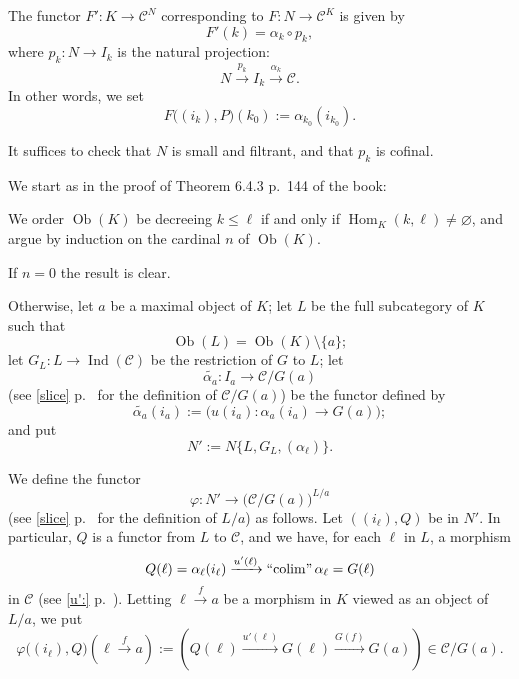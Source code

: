 \documentclass[12pt]{article}
\theoremstyle{remark}
\theoremstyle{definition}
\newcommand{\C}{\mathcal C}
\newcommand{\pp}{\varphi}
\newcommand{\xr}{\xrightarrow}
\DeclareMathOperator*{\colim}{colim}
\DeclareMathOperator*{\icolim}{``\!\colim\!"}
\DeclareMathOperator{\Hom}{Hom}
\DeclareMathOperator{\Ind}{Ind}
\DeclareMathOperator{\Ob}{Ob}
\begin{document}
The functor $F':K\to\C^N$ corresponding to $F:N\to\C^K$ is given by 
$$
F'(k)=\alpha_k\circ p_k,
$$ 
where $p_k:N\to I_k$ is the natural projection: 
$$
N\xr{p_k}I_k\xr{\alpha_k}\C.
$$ 
In other words, we set
$$
F\big((i_k),P\big)(k_0):=\alpha_{k_0}(i_{k_0}).
$$ 

It suffices to check that $N$ is small and filtrant, and that $p_k$ is cofinal. 

We start as in the proof of Theorem 6.4.3 p.~144 of the book: 

We order $\Ob(K)$ be decreeing $k\le\ell$ if and only if $\Hom_K(k,\ell)\neq\varnothing$, and argue by induction on the cardinal $n$ of $\Ob(K)$. 

If $n=0$ the result is clear.

Otherwise, let $a$ be a maximal object of $K$; let $L$ be the full subcategory of $K$ such that 
$$
\Ob(L)=\Ob(K)\setminus\{a\}; 
$$ 
let $G_L:L\to\Ind(\C)$ be the restriction of $G$ to $L$; let  
$$
\widetilde{\alpha_a}:I_a\to\C/G(a)
$$ 
(see \eqref{slice} p.~\pageref{slice} for the definition of $\C/G(a)$) be the functor defined by 
$$
\widetilde{\alpha_a}(i_a):=\Big(u(i_a):\alpha_a(i_a)\to G(a)\Big);
$$
and put 
$$
N':=N\{L,G_L,(\alpha_\ell)\}.
$$ 

We define the functor 
$$ 
\pp:N'\to\big(\C/G(a)\big)^{L/a} 
$$ 
(see \eqref{slice} p.~\pageref{slice} for the definition of $L/a$) as follows. Let $((i_\ell),Q)$ be in $N'$. In particular, $Q$ is a functor from $L$ to $\C$, and we have, for each $\ell$ in $L$, a morphism 
$$
Q(\ell)=\alpha_\ell(i_\ell)\xr{u'(\ell)}\icolim\alpha_\ell=G(\ell) 
$$ 
in $\C$ (see \eqref{u':} p.~\pageref{u':}). Letting $\ell\xr fa$ be a morphism in $K$ viewed as an object of $L/a$, we put  
$$
\pp\big((i_\ell),Q\big)\left(\ell\xr fa\right):=\left(Q(\ell)\xr{u'(\ell)}G(\ell)\xr{G(f)}G(a)\right)\in\C/G(a).
$$
\end{document}
